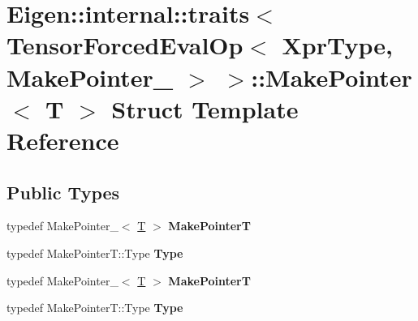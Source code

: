 \hypertarget{struct_eigen_1_1internal_1_1traits_3_01_tensor_forced_eval_op_3_01_xpr_type_00_01_make_pointer___01_4_01_4_1_1_make_pointer}{}\section{Eigen\+:\+:internal\+:\+:traits$<$ Tensor\+Forced\+Eval\+Op$<$ Xpr\+Type, Make\+Pointer\+\_\+ $>$ $>$\+:\+:Make\+Pointer$<$ T $>$ Struct Template Reference}
\label{struct_eigen_1_1internal_1_1traits_3_01_tensor_forced_eval_op_3_01_xpr_type_00_01_make_pointer___01_4_01_4_1_1_make_pointer}
\subsection*{Public Types}
\begin{DoxyCompactItemize}
\item 
\mbox{\label{struct_eigen_1_1internal_1_1traits_3_01_tensor_forced_eval_op_3_01_xpr_type_00_01_make_pointer___01_4_01_4_1_1_make_pointer_a0d638d2aa6ded5c82dc3e72654af1bae}} 
typedef Make\+Pointer\+\_\+$<$ \hyperlink{group___sparse_core___module}{T} $>$ {\bfseries Make\+PointerT}
\item 
\mbox{\label{struct_eigen_1_1internal_1_1traits_3_01_tensor_forced_eval_op_3_01_xpr_type_00_01_make_pointer___01_4_01_4_1_1_make_pointer_a286dead6328e9116913f934ce303235a}} 
typedef Make\+Pointer\+T\+::\+Type {\bfseries Type}
\item 
\mbox{\label{struct_eigen_1_1internal_1_1traits_3_01_tensor_forced_eval_op_3_01_xpr_type_00_01_make_pointer___01_4_01_4_1_1_make_pointer_a0d638d2aa6ded5c82dc3e72654af1bae}} 
typedef Make\+Pointer\+\_\+$<$ \hyperlink{group___sparse_core___module}{T} $>$ {\bfseries Make\+PointerT}
\item 
\mbox{\label{struct_eigen_1_1internal_1_1traits_3_01_tensor_forced_eval_op_3_01_xpr_type_00_01_make_pointer___01_4_01_4_1_1_make_pointer_a286dead6328e9116913f934ce303235a}} 
typedef Make\+Pointer\+T\+::\+Type {\bfseries Type}
\end{DoxyCompactItemize}



